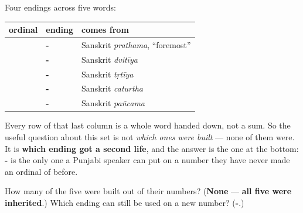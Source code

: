 \begin{grammarlens}[title={What you've built}]
Four endings across five words:

\noindent
\begin{tabularx}{\linewidth}{@{}>{\raggedright\arraybackslash}X>{\raggedright\arraybackslash}X>{\raggedright\arraybackslash}X@{}}
\toprule
\textbf{ordinal} & \textbf{ending} & \textbf{comes from} \\
\midrule
\textbf{\pa{ਪਹਿਲਾ}} & \textbf{-\pa{ਲਾ}} & Sanskrit \emph{prathama}, \textquotedblleft{}foremost\textquotedblright{} \\
\textbf{\pa{ਦੂਜਾ}} & \textbf{-\pa{ਜਾ}} & Sanskrit \emph{dvitīya} \\
\textbf{\pa{ਤੀਜਾ}} & \textbf{-\pa{ਜਾ}} & Sanskrit \emph{tṛtīya} \\
\textbf{\pa{ਚੌਥਾ}} & \textbf{-\pa{ਥਾ}} & Sanskrit \emph{caturtha} \\
\textbf{\pa{ਪੰਜਵਾਂ}} & \textbf{-\pa{ਵਾਂ}} & Sanskrit \emph{pañcama} \\
\bottomrule
\end{tabularx}

Every row of that last column is a whole word handed down, not a sum. So the useful question about this set is not \emph{which ones were built} — none of them were. It is \textbf{which ending got a second life}, and the answer is the one at the bottom: \textbf{-} is the only one a Punjabi speaker can put on a number they have never made an ordinal of before.
\end{grammarlens}

\begin{tcolorbox}[breakable,colback=teal!4,colframe=teal!35!black,title={Before you move on}]
How many of the five were built out of their numbers? (\textbf{None} — \textbf{all five were inherited}.) Which ending can still be used on a new number? (\textbf{-}.)
\end{tcolorbox}
